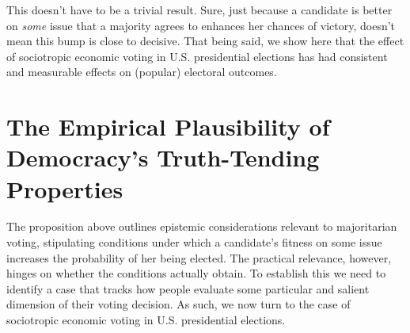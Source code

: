\documentclass[11pt]{article}
\begin{document}
 This doesn't have to be a trivial result. Sure, just because a candidate is better on \emph{some} issue that a majority agrees to enhances her chances of victory, doesn't mean this bump is close to decisive. That being said, we show here that the effect of sociotropic economic voting in U.S. presidential elections  has had consistent and measurable  effects on (popular) electoral outcomes.
 
\section{The Empirical Plausibility of Democracy's Truth-Tending Properties}%
The proposition above outlines epistemic considerations relevant to majoritarian voting, stipulating conditions under which a candidate's fitness on some issue increases the probability of her being elected.
The practical relevance, however, hinges on whether the conditions actually obtain. To establish this we need to identify a case that tracks how people evaluate some particular and salient dimension of their voting decision. %
As such, we now turn to the case of sociotropic economic voting in U.S. presidential elections.
\end{document}
